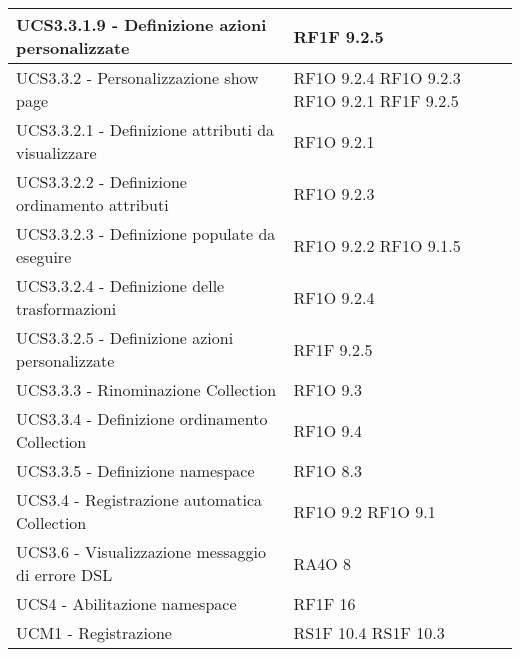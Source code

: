 \begin{center}
\begin{longtable}{ | p{5cm} | p{5cm} |}
            UCS3.3.1.9 - Definizione azioni personalizzate &  RF1F 9.2.5 \newline  \\ \hline      
            UCS3.3.2 - Personalizzazione show page &  RF1O 9.2.4 \newline  RF1O 9.2.3 \newline  RF1O 9.2.1  \newline  RF1F 9.2.5 \newline  \\ \hline      
            UCS3.3.2.1 - Definizione attributi da visualizzare &  RF1O 9.2.1  \newline  \\ \hline      
            UCS3.3.2.2 - Definizione ordinamento attributi &  RF1O 9.2.3 \newline  \\ \hline      
            UCS3.3.2.3 - Definizione populate da eseguire &  RF1O 9.2.2  \newline  RF1O 9.1.5 \newline  \\ \hline      
            UCS3.3.2.4 - Definizione delle trasformazioni &  RF1O 9.2.4 \newline  \\ \hline      
            UCS3.3.2.5 - Definizione azioni personalizzate &  RF1F 9.2.5 \newline  \\ \hline      
            UCS3.3.3 - Rinominazione Collection &  RF1O 9.3 \newline  \\ \hline      
            UCS3.3.4 - Definizione ordinamento Collection &  RF1O 9.4 \newline  \\ \hline      
            UCS3.3.5 - Definizione namespace &  RF1O 8.3 \newline  \\ \hline      
            UCS3.4 - Registrazione automatica Collection &  RF1O 9.2 \newline  RF1O 9.1  \newline  \\ \hline      
            UCS3.6 - Visualizzazione messaggio di errore DSL &  RA4O 8 \newline  \\ \hline      
            UCS4 - Abilitazione namespace &  RF1F 16 \newline  \\ \hline      
            UCM1 - Registrazione &  RS1F 10.4 \newline  RS1F 10.3 \newline  \\ \hline      

\end{longtable}
\end{center}
